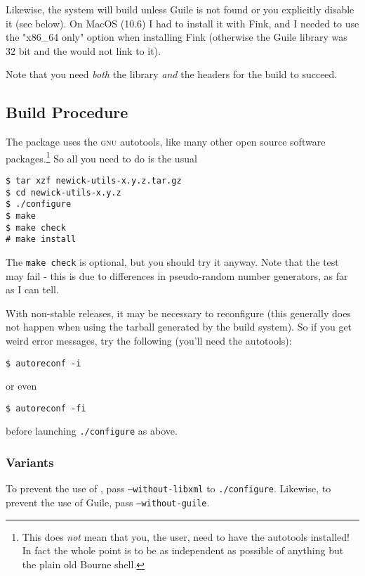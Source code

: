 Likewise, the system will build \sched{} unless Guile is not found or you
explicitly disable it (see below). On MacOS (10.6) I had to install it with
Fink, and I needed to use the "x86\_64 only" option when installing Fink
(otherwise the Guile library was 32 bit and the \nutils{} would not link to it).

Note that you need \emph{both} the library \emph{and} the headers for the build
to succeed.

\subsection{Build Procedure}
\noindent{}The package uses the \textsc{gnu} autotools, like many other open source software packages.\footnote{This does \emph{not} mean that you, the user, need to have the autotools installed! In fact the whole point is to be as independent as possible of anything but the plain old Bourne shell.} So all you need to do is the usual
\begin{verbatim}
$ tar xzf newick-utils-x.y.z.tar.gz
$ cd newick-utils-x.y.z
$ ./configure
$ make
$ make check
# make install
\end{verbatim}
The \texttt{make check} is optional, but you should try it anyway. Note that
the \gen{} test may fail - this is due to differences in pseudo-random number
generators, as far as I can tell.

With non-stable releases, it may be necessary to reconfigure (this generally
does not happen when using the tarball generated by the build system). So if you
get weird error messages, try the following (you'll need the \gnu{} autotools):

\begin{verbatim}
$ autoreconf -i
\end{verbatim}

or even

\begin{verbatim}
$ autoreconf -fi
\end{verbatim}

before launching \texttt{./configure} as above.

\subsubsection{Variants}

To prevent the use of \libxml, pass \texttt{--without-libxml} to
\texttt{./configure}. Likewise, to prevent the use of Guile, pass
\texttt{--without-guile}. 

